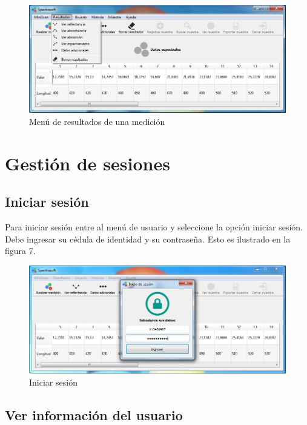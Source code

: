 \begin{figure}[H]
  \centering
  \includegraphics[width=1\linewidth]{./img/resultados-menu.jpg}
\caption{Men\'{u} de resultados de una medici\'{o}n}
\end{figure}

\section{Gesti\'{o}n de sesiones}

	\subsection{Iniciar sesi\'{o}n}
	
	Para iniciar sesi\'{o}n entre al men\'{u} de usuario y seleccione la opci\'{o}n iniciar sesi\'{o}n. Debe ingresar su c\'{e}dula de identidad y su contrase\~{n}a. Esto es ilustrado en la figura 7.
	
\begin{figure}[H]
  \centering
  \includegraphics[width=1\linewidth]{./img/inicio-sesion.jpg}
\caption{Iniciar sesi\'{o}n}
\end{figure}
	
	\subsection{Ver informaci\'{o}n del usuario}
	
